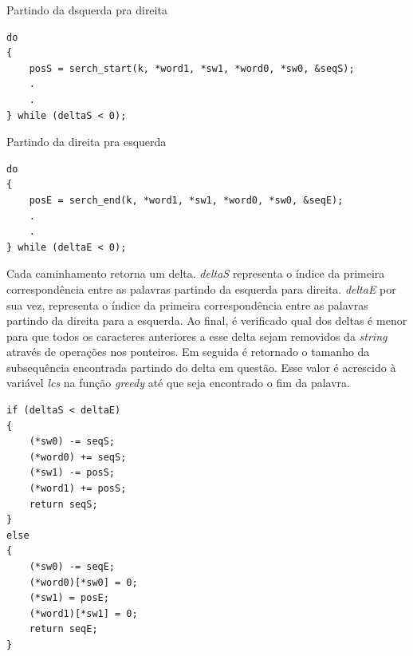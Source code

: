Partindo da dsquerda pra direita
\begin{lstlisting}
do
{
    posS = serch_start(k, *word1, *sw1, *word0, *sw0, &seqS);
    .
    .
} while (deltaS < 0);
\end{lstlisting}

Partindo da direita pra esquerda
\begin{lstlisting}
do
{
    posE = serch_end(k, *word1, *sw1, *word0, *sw0, &seqE);
    .
    .
} while (deltaE < 0);
\end{lstlisting}

Cada caminhamento retorna um delta. {\it deltaS} representa o índice
da primeira correspondência entre as palavras partindo da esquerda
para direita. {\it deltaE} por sua vez, representa o índice da 
primeira correspondência entre as palavras partindo da direita para
a esquerda. Ao final, é verificado qual dos deltas é menor para que 
todos os caracteres anteriores a esse delta sejam removidos da {\it string}
através de operações nos ponteiros. Em seguida é retornado o tamanho da 
subsequência encontrada partindo do delta em questão. Esse valor é acrescido
à variável {\it lcs} na função {\it greedy} até que seja encontrado o fim
da palavra.

\begin{lstlisting}
if (deltaS < deltaE)
{
    (*sw0) -= seqS;
    (*word0) += seqS;
    (*sw1) -= posS;
    (*word1) += posS;
    return seqS;
}
else
{
    (*sw0) -= seqE;
    (*word0)[*sw0] = 0;
    (*sw1) = posE;
    (*word1)[*sw1] = 0;
    return seqE;
}
\end{lstlisting}
